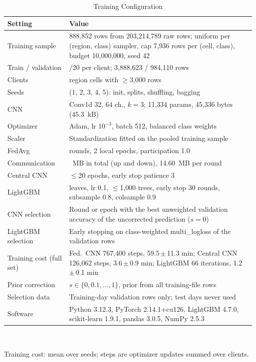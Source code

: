 \begin{table}[t]
\centering
\footnotesize
\caption{Training Configuration}
\label{tab:config}
\setlength{\tabcolsep}{3pt}
\begin{tabularx}{\columnwidth}{@{}l>{\raggedright\arraybackslash}X@{}}
\toprule
Setting & Value \\
\midrule
Training sample & 4{,}888{,}852 rows from 203{,}214{,}789 raw rows; uniform per (region, class) sampler, cap 7{,}936 rows per (cell, class), budget 10{,}000{,}000, seed 42 \\
Train / validation & 80/20 per client; 3{,}888{,}623 / 984{,}110 rows \\
Clients & 161 region cells with $\geq$3{,}000 rows \\
Seeds & 5 (1, 2, 3, 4, 5): init, splits, shuffling, bagging \\
CNN & Conv1d 32, 64 ch., $k=3$; 11{,}334 params, 45{,}336 bytes (45.3~kB) \\
Optimizer & Adam, lr $10^{-3}$, batch 512, balanced class weights \\
Scaler & Standardization fitted on the pooled training sample \\
FedAvg & 50 rounds, 2 local epochs, participation 1.0 \\
Communication & 729.9~MB in total (up and down), 14.60~MB per round \\
Central CNN & $\leq$20 epochs, early stop patience 3 \\
LightGBM & 127 leaves, lr 0.1, $\leq$1{,}000 trees, early stop 30 rounds, subsample 0.8, colsample 0.9 \\
CNN selection & Round or epoch with the best unweighted validation accuracy of the uncorrected prediction ($s=0$) \\
LightGBM selection & Early stopping on class-weighted multi\_logloss of the validation rows \\
Training cost (full set) & Fed.\ CNN 767{,}400 steps, 59.5{\,}$\pm${\,}11.3 min; Central CNN 126{,}062 steps, 3.6{\,}$\pm${\,}0.9 min; LightGBM 66 iterations, 1.2{\,}$\pm${\,}0.1 min \\
Prior correction & $s\in\{0,0.1,\ldots,1\}$, prior from all training-file rows \\
Selection data & Training-day validation rows only; test days never used \\
Software & Python 3.12.3, PyTorch 2.14.1+cu126, LightGBM 4.7.0, scikit-learn 1.9.1, pandas 3.0.5, NumPy 2.5.3 \\
\bottomrule
\end{tabularx}
\\[2pt]
\parbox{\linewidth}{\scriptsize Training cost: mean over seeds; steps are optimizer updates summed over clients.}
\end{table}
